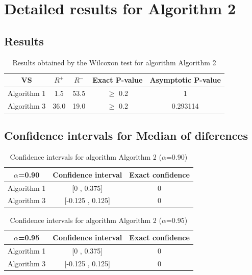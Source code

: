 \documentclass[a4paper,10pt]{article}
\begin{document}
 \clearpage 


\section{Detailed results for Algorithm 2}


\subsection{Results}

\begin{table}[!htp]
\centering\small
\begin{tabular}{
|c|c|c|c|c|}
\hline
 VS & $R^{+}$ & $R^{-}$ & Exact P-value & Asymptotic P-value \\ \hline 
Algorithm 1 & 1.5 & 53.5 & $\geq$ 0.2 & 1\\ \hline 
Algorithm 3 & 36.0 & 19.0 & $\geq$ 0.2 & 0.293114\\ \hline 

\end{tabular}
\caption{Results obtained by the Wilcoxon test for algorithm Algorithm 2}
\end{table}

\subsection{Confidence intervals for Median of diferences}

\begin{table}[!htp]
\centering\small
\begin{tabular}{
|c|c|c|}
\hline
 $\alpha$=0.90 & Confidence interval & Exact confidence \\ \hline 
Algorithm 1 & [0 , 0.375] & 0\\ \hline 
Algorithm 3 & [-0.125 , 0.125] & 0\\ \hline 

\end{tabular}
\caption{Confidence intervals for algorithm Algorithm 2 ($\alpha$=0.90)}
\end{table}
\begin{table}[!htp]
\centering\small
\begin{tabular}{
|c|c|c|}
\hline
 $\alpha$=0.95 & Confidence interval & Exact confidence \\ \hline 
Algorithm 1 & [0 , 0.375] & 0\\ \hline 
Algorithm 3 & [-0.125 , 0.125] & 0\\ \hline 

\end{tabular}
\caption{Confidence intervals for algorithm Algorithm 2 ($\alpha$=0.95)}
\end{table}
\end{document}
